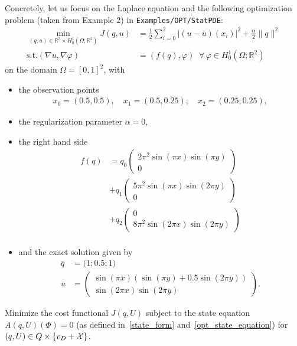 \documentclass[prodmode,acmtoms]{acmsmall}
\numberwithin{equation}{section}
\renewcommand{\phi}{\varphi}
\begin{document}
Concretely, let us focus on the Laplace equation and 
the following optimization problem (taken from 
Example 2) in \texttt{Examples/OPT/StatPDE}:
\begin{align*}
\min_{(q,u)\in \mathbb R^3 \times H_0^1(\Omega; \mathbb R^2)} J(q,u) &=
\frac{1}{2} \sum_{i=0}^2 |(u-\overline u)(x_i)|^2 + \frac{\alpha}{2}\|q\|^2\\
\text{s.t.} (\nabla u,\nabla \phi) &= (f(q),\phi)\;\;\forall\,\phi \in H^1_0(\Omega; \mathbb R^2)
\end{align*}
on the domain $\Omega = [0,1]^2$, with
\begin{itemize}
\item the observation points
\begin{align*}
x_0 = (0.5, 0.5), \quad x_1 = (0.5, 0.25),\quad x_2 = (0.25, 0.25),
\end{align*}
\item the regularization parameter $\alpha = 0$, 
\item the right hand side
\begin{align*}
 f(q) &= q_0 \left(\begin{matrix}2\pi^2  \sin( \pi x) \sin(\pi y)\\0 \end{matrix}\right)\\
      &+ q_1 \left(\begin{matrix}5\pi^2  \sin( \pi x) \sin(2\pi y)\\0 \end{matrix}\right)\\
      &+ q_2 \left(\begin{matrix}0 \\8\pi^2  \sin(2\pi x) \sin(2\pi y)\end{matrix}\right)\\
\end{align*}
\item and the exact solution given by 
\begin{align*}
 \overline{q} &= \bigl(1;0.5;1\bigr)\\
 \overline{u}& = \left(\begin{matrix} \sin( \pi x)( \sin(\pi y)+0.5\sin(2\pi y))\\\sin(2\pi x) \sin(2\pi y) \end{matrix}\right).
\end{align*}
\end{itemize}
\begin{defi}
\label{problem_constraint_optimization}
Minimize the cost functional $J(q,U)$ subject to the state equation
$A(q,U)(\Phi) = 0$ (as defined
in~\eqref{state_form} and~\eqref{opt_state_equation}) for $(q,U) \in 
Q\times  \{v_D+{\cal X}\}$. 
\end{defi}
\end{document}

